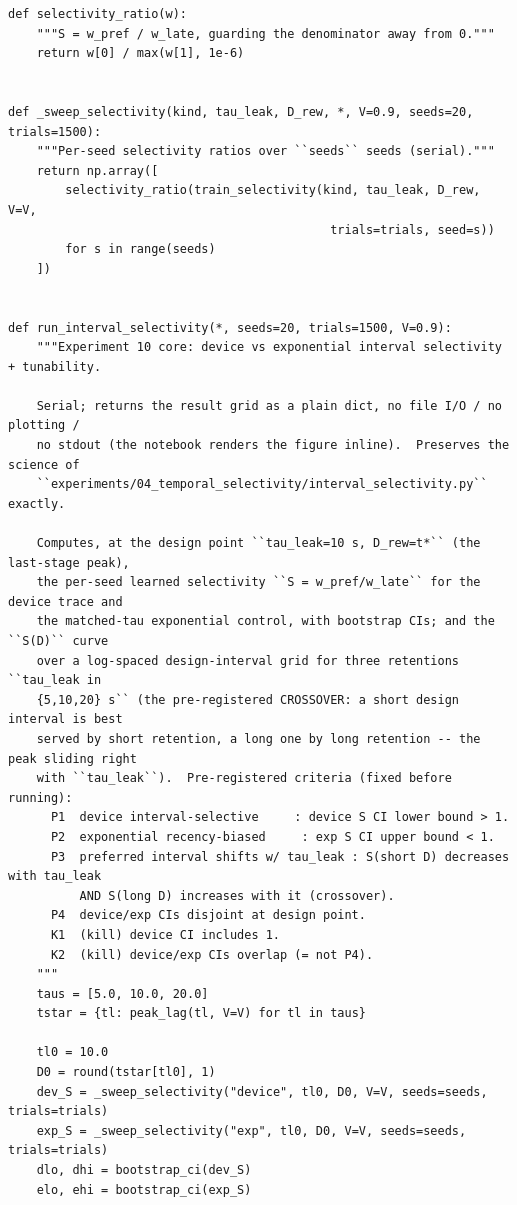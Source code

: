\begin{lstlisting}[caption={mrl\_trace/selectivity.py},label={lst:siox-src-selectivity}]
def selectivity_ratio(w):
    """S = w_pref / w_late, guarding the denominator away from 0."""
    return w[0] / max(w[1], 1e-6)


def _sweep_selectivity(kind, tau_leak, D_rew, *, V=0.9, seeds=20, trials=1500):
    """Per-seed selectivity ratios over ``seeds`` seeds (serial)."""
    return np.array([
        selectivity_ratio(train_selectivity(kind, tau_leak, D_rew, V=V,
                                             trials=trials, seed=s))
        for s in range(seeds)
    ])


def run_interval_selectivity(*, seeds=20, trials=1500, V=0.9):
    """Experiment 10 core: device vs exponential interval selectivity + tunability.

    Serial; returns the result grid as a plain dict, no file I/O / no plotting /
    no stdout (the notebook renders the figure inline).  Preserves the science of
    ``experiments/04_temporal_selectivity/interval_selectivity.py`` exactly.

    Computes, at the design point ``tau_leak=10 s, D_rew=t*`` (the last-stage peak),
    the per-seed learned selectivity ``S = w_pref/w_late`` for the device trace and
    the matched-tau exponential control, with bootstrap CIs; and the ``S(D)`` curve
    over a log-spaced design-interval grid for three retentions ``tau_leak in
    {5,10,20} s`` (the pre-registered CROSSOVER: a short design interval is best
    served by short retention, a long one by long retention -- the peak sliding right
    with ``tau_leak``).  Pre-registered criteria (fixed before running):
      P1  device interval-selective     : device S CI lower bound > 1.
      P2  exponential recency-biased     : exp S CI upper bound < 1.
      P3  preferred interval shifts w/ tau_leak : S(short D) decreases with tau_leak
          AND S(long D) increases with it (crossover).
      P4  device/exp CIs disjoint at design point.
      K1  (kill) device CI includes 1.
      K2  (kill) device/exp CIs overlap (= not P4).
    """
    taus = [5.0, 10.0, 20.0]
    tstar = {tl: peak_lag(tl, V=V) for tl in taus}

    tl0 = 10.0
    D0 = round(tstar[tl0], 1)
    dev_S = _sweep_selectivity("device", tl0, D0, V=V, seeds=seeds, trials=trials)
    exp_S = _sweep_selectivity("exp", tl0, D0, V=V, seeds=seeds, trials=trials)
    dlo, dhi = bootstrap_ci(dev_S)
    elo, ehi = bootstrap_ci(exp_S)


\end{lstlisting}
